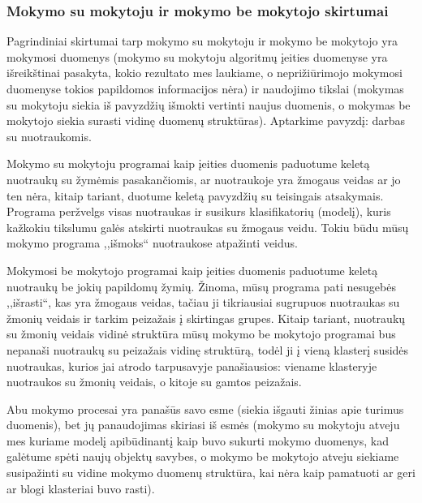 
\subsubsection{Mokymo su mokytoju ir mokymo be mokytojo skirtumai}

Pagrindiniai skirtumai tarp mokymo su mokytoju ir mokymo be mokytojo yra
mokymosi duomenys (mokymo su mokytoju algoritmų įeities duomenyse yra
išreikštinai pasakyta, kokio rezultato mes laukiame, o neprižiūrimojo mokymosi
duomenyse tokios papildomos informacijos nėra) ir naudojimo tikslai (mokymas
su mokytoju siekia iš pavyzdžių išmokti vertinti naujus duomenis, o mokymas be
mokytojo siekia surasti vidinę duomenų struktūras). Aptarkime pavyzdį: darbas
su nuotraukomis.

Mokymo su mokytoju programai kaip įeities duomenis paduotume keletą 
nuotraukų su žymėmis pasakančiomis, ar nuotraukoje yra žmogaus veidas ar jo ten
nėra, kitaip tariant, duotume keletą pavyzdžių su teisingais atsakymais.
Programa peržvelgs visas nuotraukas ir susikurs klasifikatorių (modelį), kuris
kažkokiu tikslumu galės atskirti nuotraukas su žmogaus veidu. Tokiu būdu mūsų
mokymo programa ,,išmoks`` nuotraukose atpažinti veidus.

Mokymosi be mokytojo programai kaip įeities duomenis paduotume keletą
nuotraukų be jokių papildomų žymių. Žinoma, mūsų programa pati nesugebės
,,išrasti``, kas yra žmogaus veidas, tačiau ji tikriausiai sugrupuos nuotraukas
su žmonių veidais ir tarkim peizažais į skirtingas grupes. Kitaip tariant,
nuotraukų su žmonių veidais vidinė struktūra mūsų mokymo be mokytojo programai
bus nepanaši nuotraukų su peizažais vidinę struktūrą, todėl ji į vieną klasterį
susidės nuotraukas, kurios jai atrodo tarpusavyje panašiausios: viename
klasteryje nuotraukos su žmonių veidais, o kitoje su gamtos peizažais.

Abu mokymo procesai yra panašūs savo esme (siekia išgauti žinias apie turimus
duomenis), bet jų panaudojimas skiriasi iš esmės (mokymo su mokytoju atveju mes
kuriame modelį apibūdinantį kaip buvo sukurti mokymo duomenys, kad galėtume
spėti naujų objektų savybes, o mokymo be mokytojo atveju siekiame susipažinti
su vidine mokymo duomenų struktūra, kai nėra kaip pamatuoti ar geri ar blogi
klasteriai buvo rasti).


